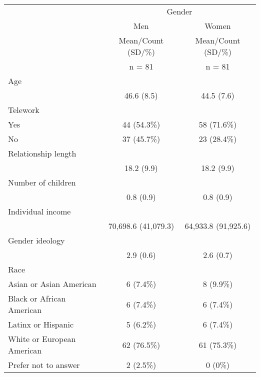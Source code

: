 \documentclass[
  english,
  man]{apa6}
\begin{document}
\begin{table}[ ht ] 
\centering 
\caption{}\label{}
\begin{tabular}{ l c c }
\toprule
 &   \multicolumn{ 2 }{c}{ Gender }\\ 
  & Men & Women \\ 
  & Mean/Count (SD/\%) & Mean/Count (SD/\%) \\
 & n = 81 & n = 81 \\ 
 \midrule
Age &   &  \\ 
\hspace{6pt}   & 46.6 (8.5) & 44.5 (7.6)\\ 
Telework &   &  \\ 
\hspace{6pt}    Yes & 44 (54.3\%) & 58 (71.6\%)\\ 
\hspace{6pt}    No & 37 (45.7\%) & 23 (28.4\%)\\ 
Relationship length &   &  \\ 
\hspace{6pt}   & 18.2 (9.9) & 18.2 (9.9)\\ 
Number of children &   &  \\ 
\hspace{6pt}   & 0.8 (0.9) & 0.8 (0.9)\\ 
Individual income &   &  \\ 
\hspace{6pt}   & 70,698.6 (41,079.3) & 64,933.8 (91,925.6)\\ 
Gender ideology &   &  \\ 
\hspace{6pt}   & 2.9 (0.6) & 2.6 (0.7)\\ 
Race &   &  \\ 
\hspace{6pt}    Asian or Asian American & 6 (7.4\%) & 8 (9.9\%)\\ 
\hspace{6pt}    Black or African American & 6 (7.4\%) & 6 (7.4\%)\\ 
\hspace{6pt}    Latinx or Hispanic & 5 (6.2\%) & 6 (7.4\%)\\ 
\hspace{6pt}    White or European American & 62 (76.5\%) & 61 (75.3\%)\\ 
\hspace{6pt}    Prefer not to answer & 2 (2.5\%) & 0 (0\%)\\ 
\bottomrule

\end{tabular}
\end{table}
\end{document}
